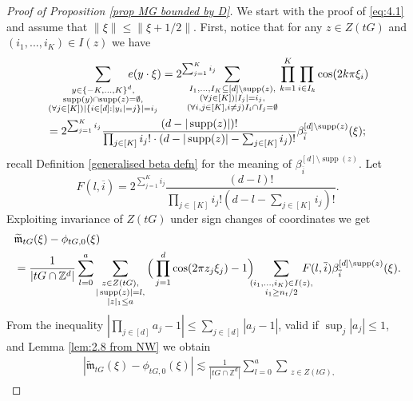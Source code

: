 \documentclass[a4paper,oneside, reqno]{amsart}
\numberwithin{equation}{section}
\theoremstyle{definition}%
\theoremstyle{definition}
\theoremstyle{definition}%
\theoremstyle{definition}
\newcommand{\Z}{\mathbb{Z}}
\DeclareMathOperator{\supp}{supp}
\begin{document}
\begin{proof}[Proof of Proposition \ref{prop MG bounded by D}]
We start with the proof of  \eqref{eq:4.1} and assume that $\|\xi\| \leq \| \xi+1/2 \|$. First, notice that for any $z \in Z(tG)$ and $(i_1,...,i_K) \in I(z)$ we have
\begin{equation}
\label{eq:syebd}
\begin{split}
&\sum_{\substack{y \in \{-K,...,K\}^d,  
\\ \supp(y) \cap \supp(z)= \emptyset, 
\\
(\forall j \in [K]) |\{i \in [d]: |y_i|=j\}|=i_j
}}\hspace{-1cm} e(y \cdot \xi)= 2^{\sum_{j=1}^K i_j} \hspace{-1cm}\sum_{\substack{I_1,...,I_K \subseteq [d] \setminus \supp(z), \\
 (\forall j \in [K]) |I_j|=i_j, \\
    (\forall i,j \in [K], i \neq j) I_i \cap I_j=\emptyset}} \prod_{k=1}^K \prod_{i \in I_k} \cos(2k \pi \xi_i)   
\\
&=  2^{\sum_{j=1}^K i_j} \frac{(d-|\supp(z)|)!}{\prod_{j \in [K]}i_j! \cdot (d-|\supp(z)|-\sum_{j \in [K]}i_j)!} \beta_{\overline{i}}^{[d] \setminus \supp(z)} (\xi);
\end{split}
\end{equation}
recall Definition \ref{generalised beta defn} for the meaning of $\beta_{\overline{i}}^{[d] \setminus \supp(z)}.$ 
Let 
\[
F(l,\overline{i})=  2^{\sum_{j=1}^K i_j} \frac{(d-l)!}{\prod_{j \in [K]}i_j! (d-l-\sum_{j \in [K]}i_j)!}.
\]
Exploiting invariance of $Z(tG)$ under sign changes of coordinates we get
\begin{align*}
&\widetilde{\mathfrak{m}}_{tG}(\xi)-\phi_{tG,0}(\xi)\\
&= \frac{1}{|tG \cap \Z^d|} \sum_{l=0}^a \sum_{\substack{z \in Z(tG),
\\ |\supp(z)|=l, \\ |z|_1 \le a
}} \Big( \prod_{j=1}^d \cos(2\pi z_j \xi_j)-1 \Big)  \hspace{-0.2cm}\sum_{\substack{(i_1,...,i_K) \in I(z), 
\\ 
i_1 \geq n_t/2
}} \hspace{-0.4cm} F(l, \overline{i}) \beta_{\overline{i}}^{[d] \setminus  \supp(z)}(\xi).
\end{align*}
From the inequality $|\prod_{j \in [d]} a_j - 1| \leq \sum_{j \in [d]} |a_j-1|$, valid if $\sup_j |a_j| \leq 1$, and Lemma \ref{lem:2.8 from NW} we obtain 
\begin{align*} 
&|\widetilde{\mathfrak{m}}_{tG}(\xi)-\phi_{tG,0}(\xi)| \lesssim 
\frac{1}{|tG \cap \Z^d|} \sum_{l=0}^a \sum_{\substack{z \in Z(tG),
}}
\end{align*}
\end{proof}
\end{document}
